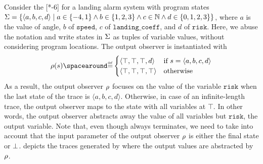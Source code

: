 \begin{example}
  Consider the [*-6] for a landing alarm system with program states $\Sigma=\{\langle a, b, c, d \rangle \mid a\in\{-4,1\}\land b\in\{1,2,3\}\land c\in\mathbb{N} \land d\in\{0,1,2,3\}\}$, where $a$ is the value of $\text{angle}$, $b$ of $\texttt{speed}$, $c$ of $\texttt{landing\_coeff}$, and $d$ of $\texttt{risk}$.
  Here, we abuse the notation and write states in $\Sigma$ as tuples of variable values, without considering program locations.
  The output observer is instantiated with
  \[
  \outputobs(\defstate) \DefeQ \begin{cases}
    \langle \top, \top, \top, d \rangle & \text{if } \defstate = \langle a, b, c, d \rangle \\
    \langle \top, \top, \top, \top \rangle & \text{otherwise}
  \end{cases}
  \]
  As a result, the output observer $\rho$ focuses on the value of the variable $\texttt{risk}$ when the last state of the trace is $\langle a, b, c, d \rangle$. Otherwise, in case of an infinite-length trace, the output observer maps to the state with all variables at $\top$.
  In other words, the output observer abstracts away the value of all variables but $\texttt{risk}$, the output variable.
  Note that, even though  always terminates, we need to take into account that the input parameter of the output observer $\rho$ is either the final state or $\bot$.
   depicts the traces generated by  where the output values are abstracted by $\rho$.
\end{example}
